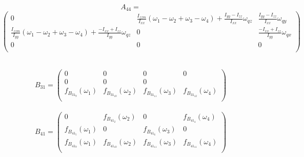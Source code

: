 \documentclass[main]{subfiles}
\begin{document}
$$A_{44}=$$
\vspace{-20pt}
{\footnotesize
\begin{equation}
\left(\begin{array}{ccc}
0 &\frac{I_{zzm}}{I_{xx}}(\omega_1-\omega_2+\omega_3-\omega_4) + \frac{I_{yy}-I_{zz}}{I_{xx}}\omega_{qz}& \frac{I_{yy}-I_{zz}}{I_{xx}}\omega_{qy} \\
\frac{I_{zzm}}{I_{yy}}(\omega_1-\omega_2+\omega_3-\omega_4) + \frac{-I_{xx}+I_{zz}}{I_{yy}}\omega_{qz} &
0 & \frac{-I_{xx}+I_{zz}}{I_{yy}}\omega_{qx}\\
0&0&0\\
\end{array}\right)
\end{equation}\\
}

\begin{equation}
B_{31}=\left(\begin{array}{cccc}
0 & 0 & 0 &0\\
0&0&0\\
f_{B_{31_9}}(\omega_1) & f_{B_{31_10}}(\omega_2) & f_{B_{31_11}}(\omega_3) &f_{B_{31_12}}(\omega_4)\\
\end{array}\right)
\end{equation}\\

\begin{equation}
B_{41}=\left(\begin{array}{cccc}
0 & f_{B_{41_2}}(\omega_2) & 0 & f_{B_{41_4}}(\omega_4)\\
f_{B_{41_5}}(\omega_1)&0&f_{B_{41_6}}(\omega_3)&0\\
f_{B_{41_9}}(\omega_1) & f_{B_{41_10}}(\omega_2) & f_{B_{41_11}}(\omega_3) &f_{B_{41_11}}(\omega_4)\\
\end{array}\right)
\end{equation}
\end{document}
